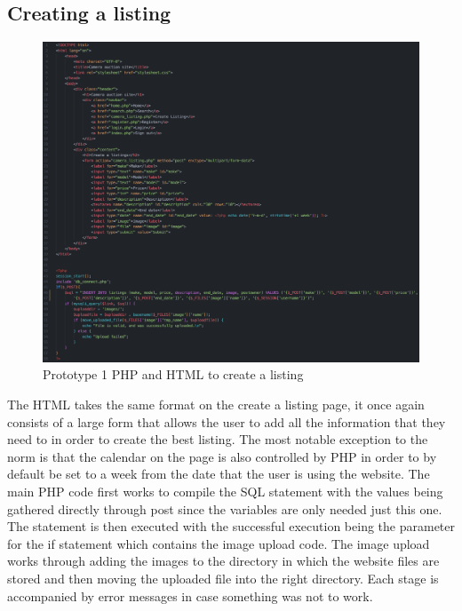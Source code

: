 \subsection{Creating a listing}
 \begin{figure}[H]
     \centering
     \includegraphics[scale=0.3]{ch3_developing/proto1/pro1_cameralisting.png}
     \caption{Prototype 1 PHP and HTML to create a listing}
     \label{fig:pro1_create}
 \end{figure}
The HTML takes the same format on the create a listing page, it once again consists of a large form that allows the user to add all the information that they need to in order to create the best listing. The most notable exception to the norm is that the calendar on the page is also controlled by PHP in order to by default be set to a week from the date that the user is using the website. The main PHP code first works to compile the SQL statement with the values being gathered directly through post since the variables are only needed just this one. The statement is then executed with the successful execution being the parameter for the if statement which contains the image upload code. The image upload works through adding the images to the directory in which the website files are stored and then moving the uploaded file into the right directory. Each stage is accompanied by error messages in case something was not to work.
